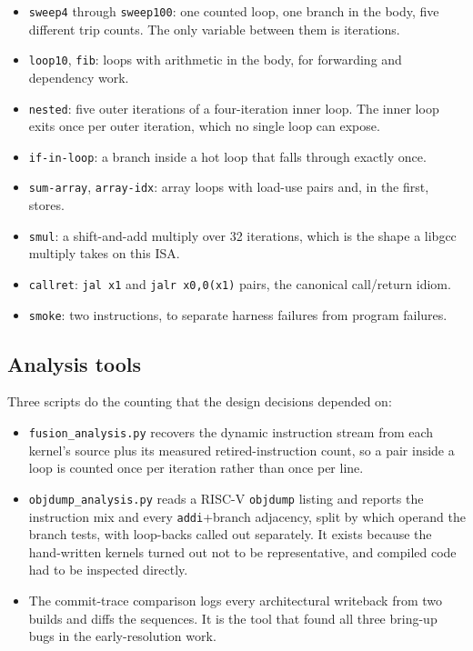 \documentclass[11pt]{article}
\begin{document}
\begin{itemize}
\item \texttt{sweep4} through \texttt{sweep100}: one counted loop, one branch in the body, five
  different trip counts. The only variable between them is iterations.
\item \texttt{loop10}, \texttt{fib}: loops with arithmetic in the body, for forwarding and
  dependency work.
\item \texttt{nested}: five outer iterations of a four-iteration inner loop. The inner loop
  exits once per outer iteration, which no single loop can expose.
\item \texttt{if-in-loop}: a branch inside a hot loop that falls through exactly once.
\item \texttt{sum-array}, \texttt{array-idx}: array loops with load-use pairs and, in the
  first, stores.
\item \texttt{smul}: a shift-and-add multiply over 32 iterations, which is the shape a libgcc
  multiply takes on this ISA.
\item \texttt{callret}: \texttt{jal x1} and \texttt{jalr x0,0(x1)} pairs, the canonical
  call/return idiom.
\item \texttt{smoke}: two instructions, to separate harness failures from program failures.
\end{itemize}

\subsection{Analysis tools}

Three scripts do the counting that the design decisions depended on:

\begin{itemize}
\item \texttt{fusion\_analysis.py} recovers the dynamic instruction stream from each kernel's
  source plus its measured retired-instruction count, so a pair inside a loop is counted once
  per iteration rather than once per line.
\item \texttt{objdump\_analysis.py} reads a RISC-V \texttt{objdump} listing and reports the
  instruction mix and every \texttt{addi}+branch adjacency, split by which operand the branch
  tests, with loop-backs called out separately. It exists because the hand-written kernels
  turned out not to be representative, and compiled code had to be inspected directly.
\item The commit-trace comparison logs every architectural writeback from two builds and diffs
  the sequences. It is the tool that found all three bring-up bugs in the early-resolution work.
\end{itemize}
\end{document}
